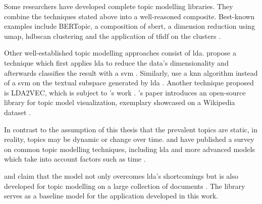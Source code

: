 Some researchers have developed complete topic modelling libraries.
They combine the techniques stated above into a well-reasoned composite.
Best-known examples include BERTopic, a composition of \ac{sbert}, a dimension reduction using \ac{umap}, \ac{hdbscan} clustering and the application of \ac{tfidf} on the clusters \cite{bertopic2022}.

Other well-established topic modelling approaches consist of \ac{lda}.
\citeauthor{lda2008} propose a technique which first applies \ac{lda} to reduce the data's dimensionality and afterwards classifies the result with a \ac{svm} \cite{lda2008}.
Similarly, \citeauthor{LDA2016} use a \ac{knn} algorithm instead of a \ac{svm} on the textual subspace generated by \ac{lda} \cite{LDA2016}.
Another technique proposed is LDA2VEC, which is subject to \citeauthor{evolution_of_topic_modeling2022}'s work \cite{evolution_of_topic_modeling2022}.
\citeauthor{topic_modeling2021}'s paper introduces an open-source library for topic model visualization, exemplary showcased on a Wikipedia dataset \cite{topic_modeling2021}.

In contrast to the assumption of this thesis that the prevalent topics are static, in reality, topics may be dynamic or change over time.
\citeauthor{topic_modeling2015} and \citeauthor{topic_modeling2020} have published a survey on common topic modelling techniques, 
including \ac{lda} and more advanced models which take into account factors such as time \cite{topic_modeling2015, topic_modeling2020}.


\citeauthor{Top2Vec2020} and \citeauthor{Topic2Vec2015} claim that the \topTwovec{} model not only overcomes \ac{lda}'s shortcomings \cite{Top2Vec2020, Topic2Vec2015}
but is also developed for topic modelling on a large collection of documents \cite{Top2Vec2020}.
The \topTwovec{} library serves as a baseline model for the application developed in this work.